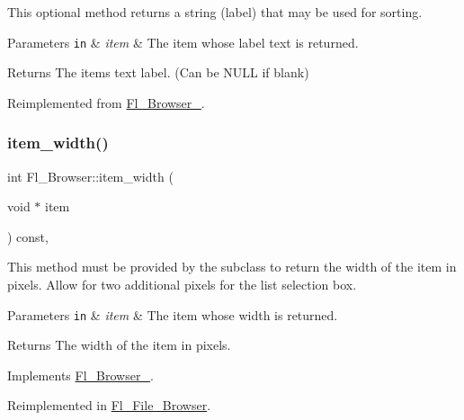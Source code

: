 This optional method returns a string (label) that may be used for sorting. 
\begin{DoxyParams}[1]{Parameters}
\mbox{\tt in}  & {\em item} & The item whose label text is returned. \\
\hline
\end{DoxyParams}
\begin{DoxyReturn}{Returns}
The item\textquotesingle{}s text label. (Can be N\+U\+LL if blank) 
\end{DoxyReturn}


Reimplemented from \hyperlink{class_fl___browser___afe9e25c3ea0c73dcba379e7a46efaddb}{Fl\+\_\+\+Browser\+\_\+}.

\mbox{\label{class_fl___browser_acc938270d35aeb63341f2953a740d7f8}} 
\subsubsection{\texorpdfstring{item\+\_\+width()}{item\_width()}}
{\footnotesize\ttfamily int Fl\+\_\+\+Browser\+::item\+\_\+width (\begin{DoxyParamCaption}\item[{void $\ast$}]{item }\end{DoxyParamCaption}) const\hspace{0.3cm}{\ttfamily [protected]}, {\ttfamily [virtual]}}

This method must be provided by the subclass to return the width of the {\ttfamily item} in pixels. Allow for two additional pixels for the list selection box. 
\begin{DoxyParams}[1]{Parameters}
\mbox{\tt in}  & {\em item} & The item whose width is returned. \\
\hline
\end{DoxyParams}
\begin{DoxyReturn}{Returns}
The width of the item in pixels. 
\end{DoxyReturn}


Implements \hyperlink{class_fl___browser___a3b84b5418ac2554dfaaeb50cfba63569}{Fl\+\_\+\+Browser\+\_\+}.



Reimplemented in \hyperlink{class_fl___file___browser_a93a0cff704c868f0d76031ec56e33c3f}{Fl\+\_\+\+File\+\_\+\+Browser}.

